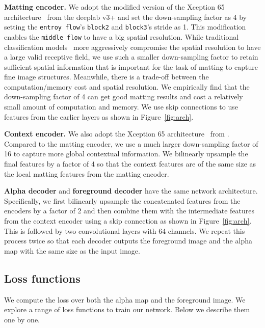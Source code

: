 \documentclass[10pt,twocolumn,letterpaper]{article}
\begin{document}
\textbf{Matting encoder.}  We adopt the modified version of the Xception 65 architecture~\cite{chollet2017xception} from the deeplab v3+\cite{deeplabv3plus2018} and set the down-sampling factor as 4 by setting the \texttt{entroy flow}'s \texttt{block2} and \texttt{block3}'s stride as 1. This modification enables the \texttt{middle flow} to have a big spatial resolution.  While traditional classification models~\cite{chollet2017xception, he2016deep, krizhevsky2012imagenet, mobilenetv22018, simonyan2014very} more aggressively compromise the spatial resolution to have a large valid receptive field, we use such a smaller down-sampling factor to retain sufficient spatial information that is important for the task of matting to capture fine image structures. Meanwhile, there is a trade-off between the computation/memory cost and spatial resolution. We empirically find that the down-sampling factor of 4 can get good matting results and cost a relatively small amount of computation and memory. We use skip connections to use features from the earlier layers as shown in Figure~\ref{fig:arch}.

\noindent\textbf{Context encoder.} We also adopt the Xception 65 architecture~\cite{chollet2017xception} from \cite{deeplabv3plus2018}. Compared to the matting encoder, we use a much larger down-sampling factor of 16 to capture more global contextual information. We bilinearly upsample the final features by a factor of 4 so that the context features are of the same size as the local matting features from the matting encoder. 


\noindent\textbf{Alpha decoder} and \textbf{foreground decoder} have the same network architecture. Specifically, we first bilinearly upsample the concatenated features from the encoders by a factor of 2 and then combine them with the intermediate features from the context encoder using a skip connection as shown in Figure~\ref{fig:arch}. This is followed by two  convolutional layers with 64 channels. We repeat this process twice so that each decoder outputs the foreground image and the alpha map with the same size as the input image.

\subsection{Loss functions} 
\label{sec:loss}

We compute the loss over both the alpha map and the foreground image. We explore a range of loss functions to train our network. Below we describe them one by one.
\end{document}
